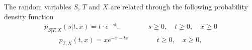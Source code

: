 \ifspanish

\else

The random variables $S$, $T$ and $X$ are related through the following probability density function
\begin{align*}
p_{S| T, X}(s| t, x) = t \cdot e^{-st},  \qquad\qquad   s \ge 0, \quad t \ge 0, \quad x \ge 0  
\end{align*}
\begin{align*}
p_{T, X}(t,x) = x e^{-x-tx}       \qquad\qquad   t \ge 0, \quad x \ge 0, 
\end{align*}



